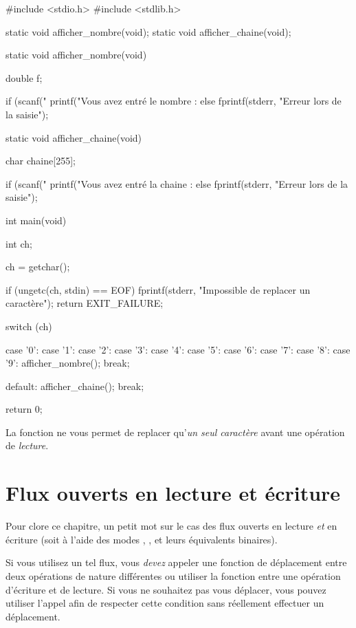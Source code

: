 \begin{C}
#include <stdio.h>
#include <stdlib.h>

static void afficher_nombre(void);
static void afficher_chaine(void);


static void afficher_nombre(void)
{
    double f;

    if (scanf("%
        printf("Vous avez entré le nombre : %
    else
        fprintf(stderr, "Erreur lors de la saisie\n");
}


static void afficher_chaine(void)
{
    char chaine[255];

    if (scanf("%
        printf("Vous avez entré la chaine : %
    else
        fprintf(stderr, "Erreur lors de la saisie\n");
}


int main(void)
{
    int ch;

    ch = getchar();

    if (ungetc(ch, stdin) == EOF)
    {
        fprintf(stderr, "Impossible de replacer un caractère\n");
        return EXIT_FAILURE;
    }

    switch (ch)
    {
    case '0':
    case '1':
    case '2':
    case '3':
    case '4':
    case '5':
    case '6':
    case '7':
    case '8':
    case '9':
        afficher_nombre();
        break;

    default:
        afficher_chaine();
        break;
    }

    return 0;
}
\end{C}

\begin{attentionbox}
  La fonction  ne vous
permet de replacer qu'\emph{un seul caractère} avant une opération de
\emph{lecture}.
\end{attentionbox}

\section{Flux ouverts en lecture et écriture}
\label{flux-ouverts-en-lecture-et-ecriture}

Pour clore ce chapitre, un petit mot sur le cas des flux ouverts en
lecture \emph{et} en écriture (soit à l'aide des modes ,
,  et leurs équivalents binaires).

Si vous utilisez un tel flux, vous \emph{devez} appeler une fonction de
déplacement entre deux opérations de nature différentes ou utiliser la
fonction  entre une opération d'écriture et de lecture.
Si vous ne souhaitez pas vous déplacer, vous pouvez utiliser l'appel
 afin de respecter cette condition
sans réellement effectuer un déplacement.

